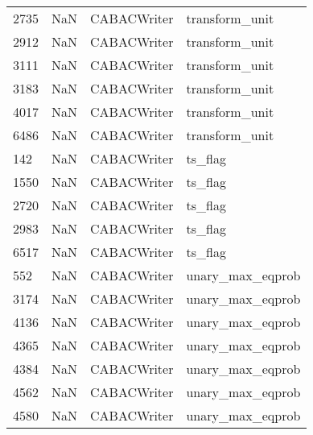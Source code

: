 \begin{tabular}{llll}
2735 &                   NaN &                CABACWriter &                            transform\_unit \\
2912 &                   NaN &                CABACWriter &                            transform\_unit \\
3111 &                   NaN &                CABACWriter &                            transform\_unit \\
3183 &                   NaN &                CABACWriter &                            transform\_unit \\
4017 &                   NaN &                CABACWriter &                            transform\_unit \\
6486 &                   NaN &                CABACWriter &                            transform\_unit \\
142  &                   NaN &                CABACWriter &                                   ts\_flag \\
1550 &                   NaN &                CABACWriter &                                   ts\_flag \\
2720 &                   NaN &                CABACWriter &                                   ts\_flag \\
2983 &                   NaN &                CABACWriter &                                   ts\_flag \\
6517 &                   NaN &                CABACWriter &                                   ts\_flag \\
552  &                   NaN &                CABACWriter &                          unary\_max\_eqprob \\
3174 &                   NaN &                CABACWriter &                          unary\_max\_eqprob \\
4136 &                   NaN &                CABACWriter &                          unary\_max\_eqprob \\
4365 &                   NaN &                CABACWriter &                          unary\_max\_eqprob \\
4384 &                   NaN &                CABACWriter &                          unary\_max\_eqprob \\
4562 &                   NaN &                CABACWriter &                          unary\_max\_eqprob \\
4580 &                   NaN &                CABACWriter &                          unary\_max\_eqprob \\

\end{tabular}
